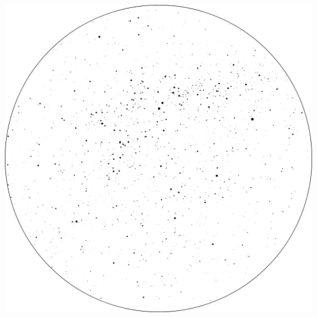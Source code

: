 \documentclass{./SAS-class-skygen}
\begin{document}
	\vspace{0.5cm}
    \begin{center}
    \includegraphics[width=\textwidth]{./pics/skychart7.png}
    \end{center}
    
    
\end{document}
